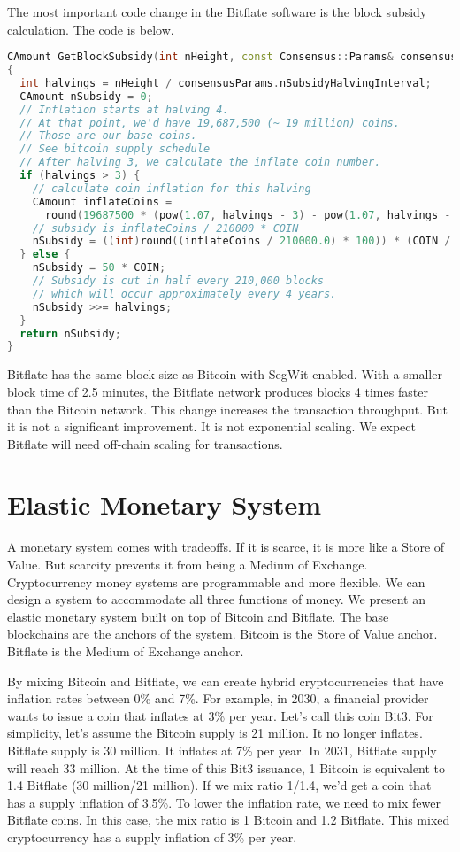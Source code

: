 \documentclass{article}      %
\begin{document}
The most important code change in the Bitflate software is the block subsidy calculation. The code is below.

\begin{lstlisting}[language=C++]
CAmount GetBlockSubsidy(int nHeight, const Consensus::Params& consensusParams)
{
  int halvings = nHeight / consensusParams.nSubsidyHalvingInterval;
  CAmount nSubsidy = 0;
  // Inflation starts at halving 4.
  // At that point, we'd have 19,687,500 (~ 19 million) coins.
  // Those are our base coins.
  // See bitcoin supply schedule
  // After halving 3, we calculate the inflate coin number.
  if (halvings > 3) {
    // calculate coin inflation for this halving
    CAmount inflateCoins =
      round(19687500 * (pow(1.07, halvings - 3) - pow(1.07, halvings - 4)));
    // subsidy is inflateCoins / 210000 * COIN
    nSubsidy = ((int)round((inflateCoins / 210000.0) * 100)) * (COIN / 100);
  } else {
    nSubsidy = 50 * COIN;
    // Subsidy is cut in half every 210,000 blocks
    // which will occur approximately every 4 years.
    nSubsidy >>= halvings;
  }
  return nSubsidy;
}
\end{lstlisting}

Bitflate has the same block size as Bitcoin with SegWit enabled. With a smaller block time of 2.5 minutes, the Bitflate network produces blocks 4 times faster than the Bitcoin network. This change increases the transaction throughput. But it is not a significant improvement. It is not exponential scaling. We expect Bitflate will need off-chain scaling for transactions.

\section{Elastic Monetary System}

A monetary system comes with tradeoffs. If it is scarce, it is more like a Store of Value. But scarcity prevents it from being a Medium of Exchange. Cryptocurrency money systems are programmable and more flexible. We can design a system to accommodate all three functions of money. We present an elastic monetary system built on top of Bitcoin and Bitflate. The base blockchains are the anchors of the system. Bitcoin is the Store of Value anchor. Bitflate is the Medium of Exchange anchor.

By mixing Bitcoin and Bitflate, we can create hybrid cryptocurrencies that have inflation rates between 0\% and 7\%. For example, in 2030, a financial provider wants to issue a coin that inflates at 3\% per year. Let's call this coin Bit3. For simplicity, let's assume the Bitcoin supply is 21 million. It no longer inflates. Bitflate supply is 30 million. It inflates at 7\% per year. In 2031, Bitflate supply will reach 33 million. At the time of this Bit3 issuance, 1 Bitcoin is equivalent to 1.4 Bitflate (30 million/21 million). If we mix ratio 1/1.4, we'd get a coin that has a supply inflation of 3.5\%. To lower the inflation rate, we need to mix fewer Bitflate coins. In this case, the mix ratio is 1 Bitcoin and 1.2 Bitflate. This mixed cryptocurrency has a supply inflation of 3\% per year.
\end{document}
